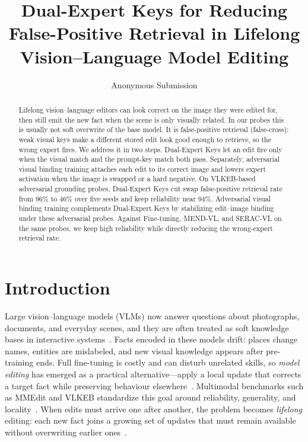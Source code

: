 \documentclass[letterpaper]{article} %
\title{Dual-Expert Keys for Reducing False-Positive Retrieval in Lifelong Vision--Language Model Editing}
\author{
    Anonymous Submission
}
\begin{document}
\maketitle

\begin{abstract}
Lifelong vision--language editors can look correct on the image they were edited for, then still emit the new fact when the scene is only visually related. In our probes this is usually not soft overwrite of the base model. It is false-positive retrieval (false-cross): weak visual keys make a different stored edit look good enough to retrieve, so the wrong expert fires. We address it in two steps. Dual-Expert Keys let an edit fire only when the visual match and the prompt-key match both pass. Separately, adversarial visual binding training attaches each edit to its correct image and lowers expert activation when the image is swapped or a hard negative. On VLKEB-based adversarial grounding probes, Dual-Expert Keys cut swap false-positive retrieval rate from 96\% to 46\% over five seeds and keep reliability near 94\%. Adversarial visual binding training complements Dual-Expert Keys by stabilizing edit--image binding under these adversarial probes. Against Fine-tuning, MEND-VL, and SERAC-VL on the same probes, we keep high reliability while directly reducing the wrong-expert retrieval rate.
\end{abstract}

\section{Introduction}
Large vision--language models (VLMs) now answer questions about photographs, documents, and everyday scenes, and they are often treated as soft knowledge bases in interactive systems~\citep{li2023blip2}.
Facts encoded in these models drift: places change names, entities are mislabeled, and new visual knowledge appears after pre-training ends.
Full fine-tuning is costly and can disturb unrelated skills, so \emph{model editing} has emerged as a practical alternative---apply a local update that corrects a target fact while preserving behaviour elsewhere~\citep{mitchell2022mend,mitchell2022serac,cheng2023mmedit}.
Multimodal benchmarks such as MMEdit and VLKEB standardize this goal around reliability, generality, and locality~\citep{cheng2023mmedit,huang2024vlkeb}.
When edits must arrive one after another, the problem becomes \emph{lifelong} editing: each new fact joins a growing set of updates that must remain available without overwriting earlier ones~\citep{chen2025liveedit}.
\end{document}
